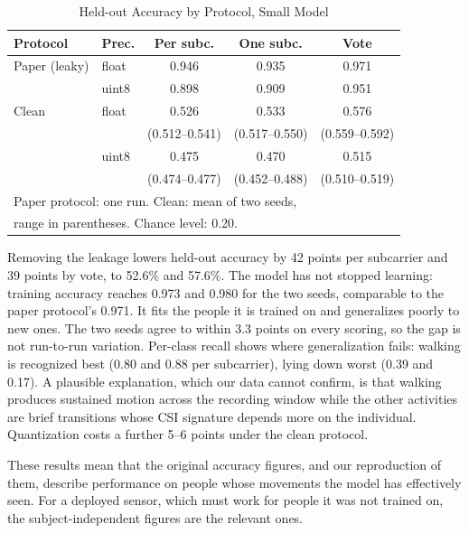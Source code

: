 \documentclass[journal]{IEEEtran}
\begin{document}
\begin{table}[!t]
\caption{Held-out Accuracy by Protocol, Small Model}
\label{tab:clean}
\centering
\setlength{\tabcolsep}{3pt}
\begin{tabular}{llccc}
\hline
Protocol & Prec. & Per subc. & One subc. & Vote\\
\hline
Paper (leaky)  & float & 0.946 & 0.935 & 0.971\\
               & uint8 & 0.898 & 0.909 & 0.951\\
Clean          & float & 0.526 & 0.533 & 0.576\\
               & & {\scriptsize(0.512--0.541)} & {\scriptsize(0.517--0.550)} & {\scriptsize(0.559--0.592)}\\
               & uint8 & 0.475 & 0.470 & 0.515\\
               & & {\scriptsize(0.474--0.477)} & {\scriptsize(0.452--0.488)} & {\scriptsize(0.510--0.519)}\\
\hline
\multicolumn{5}{l}{\footnotesize Paper protocol: one run. Clean: mean of two seeds,}\\
\multicolumn{5}{l}{\footnotesize range in parentheses. Chance level: 0.20.}
\end{tabular}
\end{table}

Removing the leakage lowers held-out accuracy by 42 points per subcarrier and 39
points by vote, to 52.6\% and 57.6\%. The model has not stopped learning: training
accuracy reaches 0.973 and 0.980 for the two seeds, comparable to the paper protocol's
0.971. It fits the people it is trained on and generalizes poorly to new ones. The two
seeds agree to within 3.3 points on every scoring, so the gap is not run-to-run
variation. Per-class recall shows where generalization fails: walking is recognized
best (0.80 and 0.88 per subcarrier), lying down worst (0.39 and 0.17). A plausible
explanation, which our data cannot confirm, is that walking produces sustained motion
across the recording window while the other activities are brief transitions whose
CSI signature depends more on the individual. Quantization costs a further 5--6
points under the clean protocol.

These results mean that the original accuracy figures, and our reproduction of them,
describe performance on people whose movements the model has effectively seen. For
a deployed sensor, which must work for people it was not trained on, the
subject-independent figures are the relevant ones.
\end{document}
